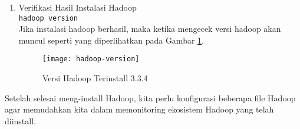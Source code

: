 \documentclass[a4paper]{tufte-handout}
\begin{document}
\begin{enumerate}
{\tt source .bashrc}

\item Verifikasi Hasil Instalasi Hadoop \\
{\tt hadoop version} \\
Jika instalasi hadoop berhasil, maka ketika mengecek versi hadoop akan muncul seperti yang diperlihatkan pada Gambar \ref{gam:hadoop-version}.
\begin{figure}[!ht]
\texttt{[image: hadoop-version]}
\caption{Versi Hadoop Terinstall 3.3.4}
\label{gam:hadoop-version}
\end{figure}
\end{enumerate}
 
\hrulefill

\clearpage
{}


Setelah selesai meng-install Hadoop, kita perlu konfigurasi beberapa file Hadoop agar memudahkan kita dalam memonitoring ekosistem Hadoop yang telah diinstall.
\end{document}
